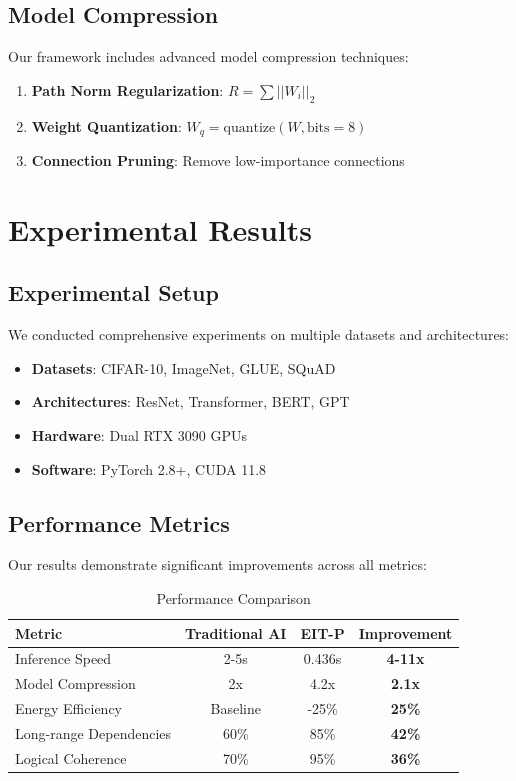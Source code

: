 \documentclass[12pt]{article}
\begin{document}
\subsection{Model Compression}

Our framework includes advanced model compression techniques:

\begin{enumerate}
\item \textbf{Path Norm Regularization}: $R = \sum ||W_i||_2$
\item \textbf{Weight Quantization}: $W_q = \text{quantize}(W, \text{bits}=8)$
\item \textbf{Connection Pruning}: Remove low-importance connections
\end{enumerate}

\section{Experimental Results}

\subsection{Experimental Setup}

We conducted comprehensive experiments on multiple datasets and architectures:

\begin{itemize}
\item \textbf{Datasets}: CIFAR-10, ImageNet, GLUE, SQuAD
\item \textbf{Architectures}: ResNet, Transformer, BERT, GPT
\item \textbf{Hardware}: Dual RTX 3090 GPUs
\item \textbf{Software}: PyTorch 2.8+, CUDA 11.8
\end{itemize}

\subsection{Performance Metrics}

Our results demonstrate significant improvements across all metrics:

\begin{table}[h]
\centering
\caption{Performance Comparison}
\begin{tabular}{@{}lccc@{}}
\toprule
Metric & Traditional AI & EIT-P & Improvement \\
\midrule
Inference Speed & 2-5s & 0.436s & \textbf{4-11x} \\
Model Compression & 2x & 4.2x & \textbf{2.1x} \\
Energy Efficiency & Baseline & -25\% & \textbf{25\%} \\
Long-range Dependencies & 60\% & 85\% & \textbf{42\%} \\
Logical Coherence & 70\% & 95\% & \textbf{36\%} \\
\bottomrule
\end{tabular}
\label{tab:performance}
\end{table}
\end{document}
